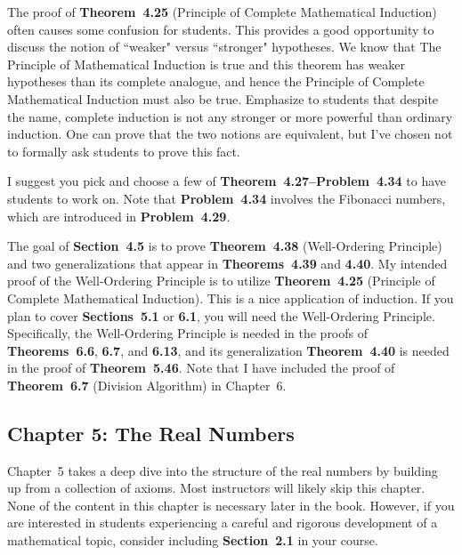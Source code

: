 \documentclass[11pt]{article}%
\newcommand{\blankline}{\pagebreak[2]\vspace{.5\baselineskip}}
\begin{document}
\blankline

The proof of \textbf{Theorem~4.25} (Principle of Complete Mathematical Induction) often causes some confusion for students.  This provides a good opportunity to discuss the notion of ``weaker" versus ``stronger" hypotheses.  We know that The Principle of Mathematical Induction is true and this theorem has weaker hypotheses than its complete analogue, and hence the Principle of Complete Mathematical Induction must also be true.  Emphasize to students that despite the name, complete induction is not any stronger or more powerful than ordinary induction.  One can prove that the two notions are equivalent, but I've chosen not to formally ask students to prove this fact.

\blankline

I suggest you pick and choose a few of \textbf{Theorem~4.27--Problem~4.34} to have students to work on.  Note that \textbf{Problem~4.34} involves the Fibonacci numbers, which are introduced in \textbf{Problem~4.29}.

\blankline

The goal of \textbf{Section~4.5} is to prove \textbf{Theorem~4.38} (Well-Ordering Principle) and two generalizations that appear in \textbf{Theorems~4.39} and \textbf{4.40}. My intended proof of the Well-Ordering Principle is to utilize \textbf{Theorem~4.25} (Principle of Complete Mathematical Induction).  This is a nice application of induction.  If you plan to cover \textbf{Sections~5.1} or \textbf{6.1}, you will need the Well-Ordering Principle.  Specifically, the Well-Ordering Principle is needed in the proofs of \textbf{Theorems~6.6}, \textbf{6.7}, and \textbf{6.13}, and its generalization \textbf{Theorem~4.40} is needed in the proof of \textbf{Theorem~5.46}. Note that I have included the proof of \textbf{Theorem~6.7} (Division Algorithm) in Chapter~6. 


\subsection*{Chapter 5: The Real Numbers}

Chapter~5 takes a deep dive into the structure of the real numbers by building up from a collection of axioms. Most instructors will likely skip this chapter. None of the content in this chapter is necessary later in the book. However, if you are interested in students experiencing a careful and rigorous development of a mathematical topic, consider including \textbf{Section~2.1} in your course.  
\end{document}
